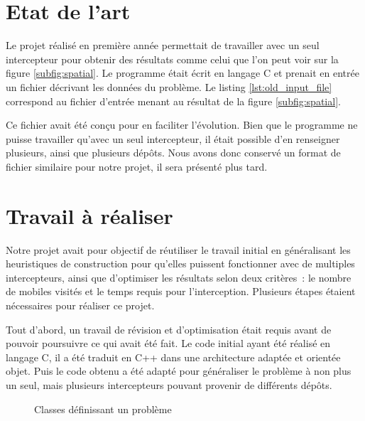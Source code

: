 	\section{Etat de l'art}

		Le projet réalisé en première année permettait de travailler avec un seul intercepteur pour obtenir des résultats comme celui que l'on peut voir sur la figure \ref{subfig:spatial}. Le programme était écrit en langage C et prenait en entrée un fichier décrivant les données du problème. Le listing \ref{lst:old_input_file} correspond au fichier d'entrée menant au résultat de la figure \ref{subfig:spatial}.

		Ce fichier avait été conçu pour en faciliter l'évolution. Bien que le programme ne puisse travailler qu'avec un seul intercepteur, il était possible d'en renseigner plusieurs, ainsi que plusieurs dépôts. Nous avons donc conservé un format de fichier similaire pour notre projet, il sera présenté plus tard.

		\begin{code}
			\label{lst:old_input_file}
		\end{code}

	\section{Travail à réaliser}
		Notre projet avait pour objectif de réutiliser le travail initial en généralisant les heuristiques de construction pour qu'elles puissent fonctionner avec de multiples intercepteurs, ainsi que d'optimiser les résultats selon deux critères : le nombre de mobiles visités et le temps requis pour l'interception.
Plusieurs étapes étaient nécessaires pour réaliser ce projet.

Tout d'abord, un travail de révision et d'optimisation était requis avant de pouvoir poursuivre ce qui avait été fait. Le code initial ayant été réalisé en langage C, il a été traduit en C++ dans une architecture adaptée et orientée objet. Puis le code obtenu a été adapté pour généraliser le problème à non plus un seul, mais plusieurs intercepteurs pouvant provenir de différents dépôts.

		\begin{figure}[h!]
			\centering
			\begin{tikzpicture}
				
			\end{tikzpicture}
			\caption{Classes définissant un problème}
			\label{fig:problem-uml}
		\end{figure}

